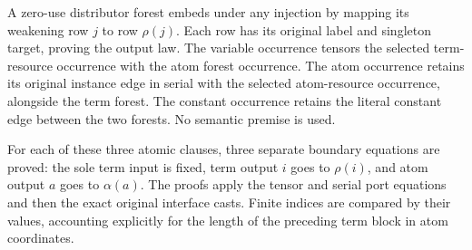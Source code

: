 


A zero-use distributor forest embeds under any injection by mapping its
weakening row $j$ to row $\rho(j)$. Each row has its original label and singleton
target, proving the output law. The variable occurrence tensors the selected
term-resource occurrence with the atom forest occurrence. The atom occurrence
retains its original instance edge in serial with the selected atom-resource
occurrence, alongside the term forest. The constant occurrence retains the
literal constant edge between the two forests. No semantic premise is used.






For each of these three atomic clauses, three separate boundary equations
are proved: the sole term input is fixed, term output $i$ goes to $\rho(i)$,
and atom output $a$ goes to $\alpha(a)$. The proofs apply the tensor and
serial port equations and then the exact original interface casts. Finite
indices are compared by their values, accounting explicitly for the length
of the preceding term block in atom coordinates.







